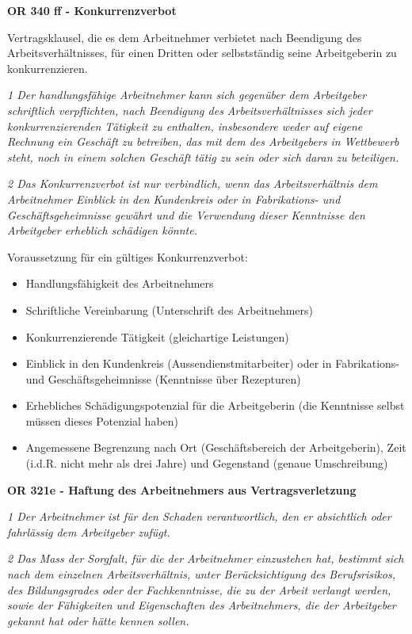 \noindent
\textbf{OR 340 ff - Konkurrenzverbot}

\noindent
Vertragsklausel, die es dem Arbeitnehmer verbietet nach Beendigung des Arbeitsverhältnisses, für einen Dritten oder
selbstständig seine Arbeitgeberin zu konkurrenzieren.

\textit{1 Der handlungsfähige Arbeitnehmer kann sich gegenüber dem Arbeitgeber schriftlich verpflichten, nach Beendigung des Arbeitsverhältnisses sich jeder konkurrenzierenden Tätigkeit zu enthalten, insbesondere weder auf eigene Rechnung ein Geschäft zu betreiben, das mit dem des Arbeitgebers in Wettbewerb steht, noch in einem solchen Geschäft tätig zu sein oder sich daran zu beteiligen.}

\textit{2 Das Konkurrenzverbot ist nur verbindlich, wenn das Arbeitsverhältnis dem Arbeitnehmer Einblick in den Kundenkreis oder in Fabrikations- und Geschäftsgeheimnisse gewährt und die Verwendung dieser Kenntnisse den Arbeitgeber erheblich schädigen könnte.}
\vspace{3mm}

\noindent
Voraussetzung für ein gültiges Konkurrenzverbot:
\begin{itemize}
  \item Handlungsfähigkeit des Arbeitnehmers
  \item Schriftliche Vereinbarung (Unterschrift des Arbeitnehmers)
  \item Konkurrenzierende Tätigkeit (gleichartige Leistungen)
  \item Einblick in den Kundenkreis (Aussendienstmitarbeiter) oder in Fabrikations- und Geschäftsgeheimnisse (Kenntnisse über Rezepturen)
  \item Erhebliches Schädigungspotenzial für die Arbeitgeberin (die Kenntnisse selbst müssen dieses Potenzial haben)
  \item Angemessene Begrenzung nach Ort (Geschäftsbereich der Arbeitgeberin), Zeit (i.d.R. nicht mehr als drei Jahre) und Gegenstand (genaue Umschreibung)
\end{itemize}
\vspace{3mm}

\noindent
\textbf{OR 321e - Haftung des Arbeitnehmers aus Vertragsverletzung}

\textit{1 Der Arbeitnehmer ist für den Schaden verantwortlich, den er absichtlich oder fahrlässig dem Arbeitgeber zufügt.}

\textit{2 Das Mass der Sorgfalt, für die der Arbeitnehmer einzustehen hat, bestimmt sich nach dem einzelnen Arbeitsverhältnis, unter Berücksichtigung des Berufsrisikos, des Bildungsgrades oder der Fachkenntnisse, die zu der Arbeit verlangt werden, sowie der Fähigkeiten und Eigenschaften des Arbeitnehmers, die der Arbeitgeber gekannt hat oder hätte kennen sollen.}

